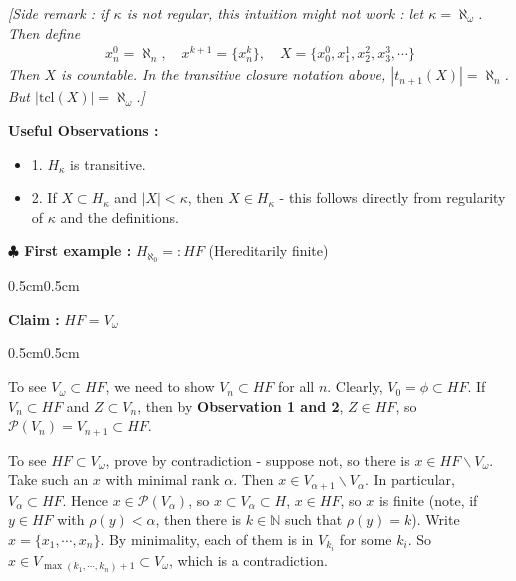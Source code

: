 \documentclass[12pt,a4paper]{article}
\newenvironment{subproof}
{\begin{changemargin}{0.5cm}{0.5cm} 
	}%
	{\end{changemargin}
}
\renewenvironment{i}
{\begin{itemize} 
	}%
	{\end{itemize}
}
\begin{document}
\emph{[Side remark : if $\kappa$ is not regular, this intuition might not work : let $\kappa = \aleph_{\omega}$. Then define
\begin{align*}
x^0_{n} = \aleph_{n}, \quad x^{k+1} = \{x_n^k \}, \quad X = \{x_0^0, x_1^1, x_2^2, x_3^3, \cdots \}
\end{align*}
Then $X$ is countable. In the transitive closure notation above, $|t_{n+1}(X)|= \aleph_n$. But $|\text{tcl}(X)|= \aleph_{\omega}$.]}
\s

\textbf{Useful Observations :}
\begin{i}
\item[1.] $H_{\kappa}$ is transitive.
\item[2.] If $X\subset H_{\kappa}$ and $|X| <\kappa$, then $X\in H_{\kappa}$ - this follows directly from regularity of $\kappa$ and the definitions.
\end{i}
\s

\textbf{$\clubsuit$ First example :} $H_{\aleph_0} =: HF$ (Hereditarily finite)
\begin{subproof}
\textbf{Claim :} $HF = V_{\omega}$
\begin{subproof}
\pf To see $V_{\omega} \subset HF$, we need to show $V_n \subset HF$ for all $n$. Clearly, $V_0 =\phi\subset HF$. If $V_n \subset HF$ and $Z\subset V_n$, then by \textbf{Observation 1 and 2}, $Z\in HF$, so $\mathscr{P}(V_n) = V_{n+1}\subset HF$.

\quad To see $HF \subset V_{\omega}$, prove by contradiction - suppose not, so there is $x\in HF\backslash V_{\omega}$. Take such an $x$ with minimal rank $\alpha$. Then $x\in V_{\alpha +1} \backslash V_{\alpha}$. In particular, $V_{\alpha} \subset HF$. Hence $x\in \mathscr{P}(V_{\alpha})$, so $x\subset V_{\alpha} \subset H$, $x\in HF$, so $x$ is finite (note, if $y\in HF$ with $\rho(y) < \alpha$, then there is $k\in \mathbb{N}$ such that $\rho(y)=k$). Write $x=\{x_1, \cdots, x_n\}$. By minimality, each of them is in $V_{k_i}$ for some $k_i$. So $x\in V_{\max(k_1, \cdots, k_n)+1} \subset V_{\omega}$, which is a contradiction.
\end{subproof}
\end{subproof}
\s
\end{document}
